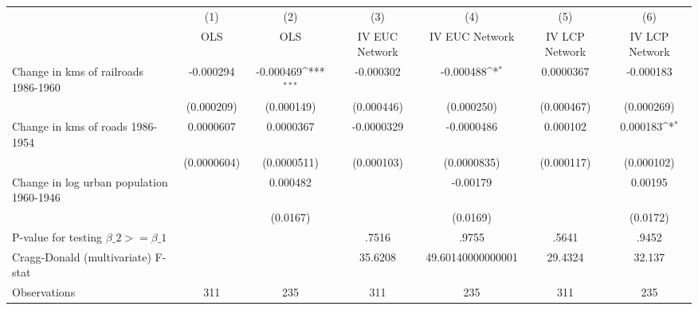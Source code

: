 {
\def\sym#1{\ifmmode^{#1}\else\(^{#1}\)\fi}
\begin{tabular}{l*{6}{c}}
\hline\hline
                &\multicolumn{1}{c}{(1)}&\multicolumn{1}{c}{(2)}&\multicolumn{1}{c}{(3)}&\multicolumn{1}{c}{(4)}&\multicolumn{1}{c}{(5)}&\multicolumn{1}{c}{(6)}\\
                &\multicolumn{1}{c}{OLS}&\multicolumn{1}{c}{OLS}&\multicolumn{1}{c}{IV EUC Network}&\multicolumn{1}{c}{IV EUC Network}&\multicolumn{1}{c}{IV LCP Network}&\multicolumn{1}{c}{IV LCP Network}\\
\hline
Change in kms of railroads 1986-1960&-0.000294         &-0.000469\sym{***}&-0.000302         &-0.000488\sym{*}  &0.0000367         &-0.000183         \\
                &(0.000209)         &(0.000149)         &(0.000446)         &(0.000250)         &(0.000467)         &(0.000269)         \\
[1em]
Change in kms of roads 1986-1954&0.0000607         &0.0000367         &-0.0000329         &-0.0000486         & 0.000102         & 0.000183\sym{*}  \\
                &(0.0000604)         &(0.0000511)         &(0.000103)         &(0.0000835)         &(0.000117)         &(0.000102)         \\
[1em]
Change in log urban population 1960-1946&                  & 0.000482         &                  & -0.00179         &                  &  0.00195         \\
                &                  & (0.0167)         &                  & (0.0169)         &                  & (0.0172)         \\
\hline
P-value for testing $\beta\_{2} >= \beta\_{1}$&                  &                  &    .7516         &    .9755         &    .5641         &    .9452         \\
Cragg-Donald (multivariate) F-stat&                  &                  &  35.6208         &49.60140000000001         &  29.4324         &   32.137         \\
Observations    &      311         &      235         &      311         &      235         &      311         &      235         \\
\hline\hline
\end{tabular}
}
